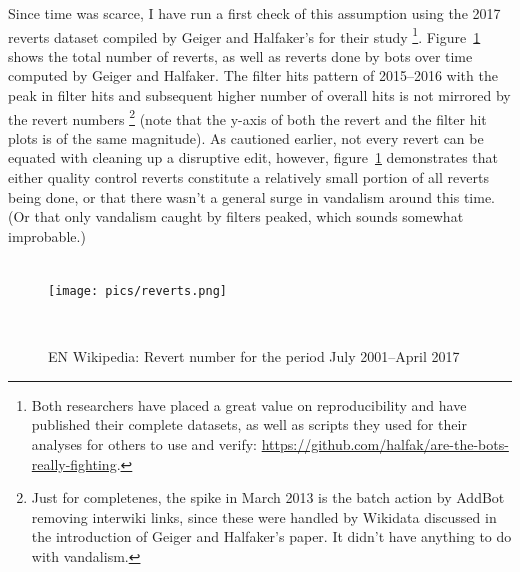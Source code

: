 Since time was scarce, I have run a first check of this assumption using the 2017 reverts dataset compiled by Geiger and Halfaker's for their study
\footnote{Both researchers have placed a great value on reproducibility and have published their complete datasets, as well as scripts they used for their analyses for others to use and verify: \url{https://github.com/halfak/are-the-bots-really-fighting}.}.
Figure~\ref{fig:reverts} shows the total number of reverts, as well as reverts done by bots over time computed by Geiger and Halfaker.
The filter hits pattern of 2015–2016 with the peak in filter hits and subsequent higher number of overall hits is not mirrored by the revert numbers
\footnote{Just for completenes, the spike in March 2013 is the batch action by AddBot removing interwiki links, since these were handled by Wikidata discussed in the introduction of Geiger and Halfaker's paper. It didn't have anything to do with vandalism.}
(note that the y-axis of both the revert and the filter hit plots is of the same magnitude).
As cautioned earlier, not every revert can be equated with cleaning up a disruptive edit, however, figure~\ref{fig:reverts} demonstrates that either quality control reverts constitute a relatively small portion of all reverts being done,
or that there wasn't a general surge in vandalism around this time.
(Or that only vandalism caught by filters peaked, which sounds somewhat improbable.)
\\
\\
\begin{figure}
\centering
  \texttt{[image: pics/reverts.png]}
  \caption{EN Wikipedia: Revert number for the period July 2001–April 2017}~\label{fig:reverts}
\end{figure}

